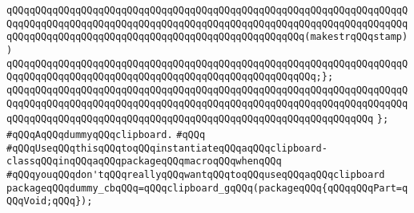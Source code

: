 \verb|qQQqqQQqqQQqqQQqqQQqqQQqqQQqqQQqqQQqqQQqqQQqqQQqqQQqqQQqqQQqqQQqqQQqqQQqqQQqqQQqqQQqqQQqqQQqqQQqqQQqqQQqqQQqqQQqqQQqqQQqqQQqqQQqqQQqqQQqqQQqqQQqqQQqqQQqqQQqqQQqqQQqqQQqqQQqqQQqqQQqqQQqqQQqqQQq(makestrqQQqstamp))|\newline
\verb|qQQqqQQqqQQqqQQqqQQqqQQqqQQqqQQqqQQqqQQqqQQqqQQqqQQqqQQqqQQqqQQqqQQqqQQqqQQqqQQqqQQqqQQqqQQqqQQqqQQqqQQqqQQqqQQqqQQqqQQqqQQq;};|\newline
\verb|qQQqqQQqqQQqqQQqqQQqqQQqqQQqqQQqqQQqqQQqqQQqqQQqqQQqqQQqqQQqqQQqqQQqqQQqqQQqqQQqqQQqqQQqqQQqqQQqqQQqqQQqqQQqqQQqqQQqqQQqqQQqqQQqqQQqqQQqqQQqqQQqqQQqqQQqqQQqqQQqqQQqqQQqqQQqqQQqqQQqqQQqqQQqqQQqqQQqqQQqqQQq|\newline
\verb|};|\newline
\newline
\newline
\newline
\newline
\newline
\newline
\verb|#qQQqAqQQqdummyqQQqclipboard.|\newline
\verb|#qQQq|\newline
\verb|#qQQqUseqQQqthisqQQqtoqQQqinstantiateqQQqaqQQqclipboard-classqQQqinqQQqaqQQqpackageqQQqmacroqQQqwhenqQQq|\newline
\verb|#qQQqyouqQQqdon'tqQQqreallyqQQqwantqQQqtoqQQquseqQQqaqQQqclipboard|\newline
\newline
\newline
\newline
\verb|packageqQQqdummy_cbqQQq=qQQqclipboard_gqQQq(packageqQQq{qQQqqQQqPart=qQQqVoid;qQQq});|\newline
\newline
\newline

